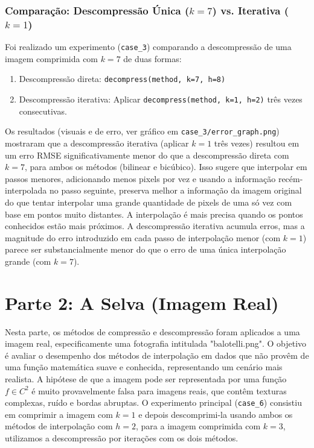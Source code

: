 \documentclass[12pt, a4paper]{article}
\begin{document}
\subsubsection{Comparação: Descompressão Única ($k=7$) vs. Iterativa ($k=1$)}
Foi realizado um experimento (\texttt{case\_3}) comparando a descompressão de uma imagem comprimida com $k=7$ de duas formas:
\begin{enumerate}
    \item Descompressão direta: \texttt{decompress(method, k=7, h=8)}
    \item Descompressão iterativa: Aplicar \texttt{decompress(method, k=1, h=2)} três vezes consecutivas.
\end{enumerate}
Os resultados (visuais e de erro, ver gráfico em \texttt{case\_3/error\_graph.png}) mostraram que a descompressão iterativa (aplicar $k=1$ três vezes) resultou em um erro RMSE significativamente menor do que a descompressão direta com $k=7$, para ambos os métodos (bilinear e bicúbico).
Isso sugere que interpolar em passos menores, adicionando menos pixels por vez e usando a informação recém-interpolada no passo seguinte, preserva melhor a informação da imagem original do que tentar interpolar uma grande quantidade de pixels de uma só vez com base em pontos muito distantes. A interpolação é mais precisa quando os pontos conhecidos estão mais próximos. A descompressão iterativa acumula erros, mas a magnitude do erro introduzido em cada passo de interpolação menor (com $k=1$) parece ser substancialmente menor do que o erro de uma única interpolação grande (com $k=7$).

\section{Parte 2: A Selva (Imagem Real)}
Nesta parte, os métodos de compressão e descompressão foram aplicados a uma imagem real, especificamente uma fotografia intitulada "balotelli.png". O objetivo é avaliar o desempenho dos métodos de interpolação em dados que não provêm de uma função matemática suave e conhecida, representando um cenário mais realista. A hipótese de que a imagem pode ser representada por uma função $f \in C^2$ é muito provavelmente falsa para imagens reais, que contêm texturas complexas, ruído e bordas abruptas.
O experimento principal (\texttt{case\_6}) consistiu em comprimir a imagem com $k=1$ e depois descomprimi-la usando ambos os métodos de interpolação com $h=2$, para a imagem comprimida com $k=3$, utilizamos a descompressão por iterações com os dois métodos.
\end{document}
